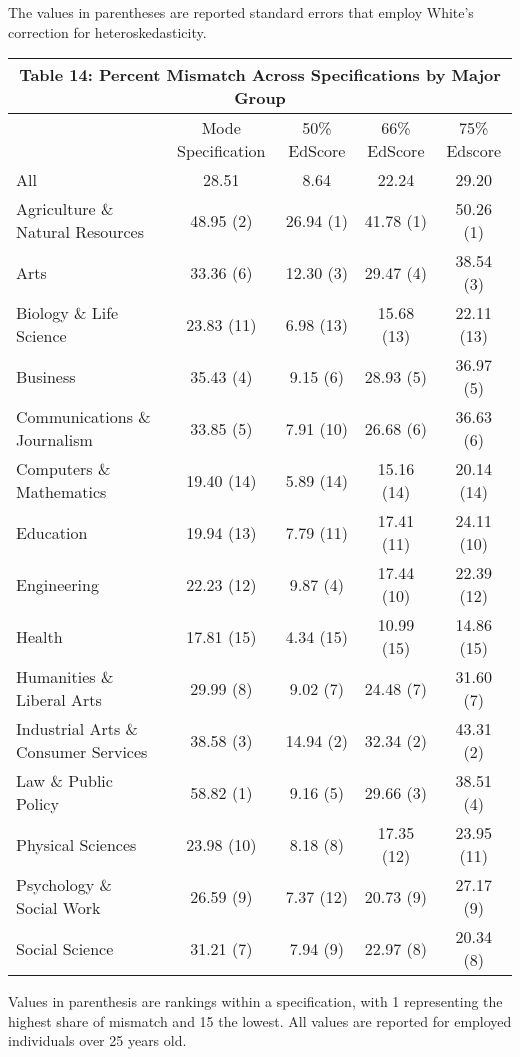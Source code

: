 \documentclass[11pt]{article}
\theoremstyle{definition}
\begin{document}
\hspace{12mm} \small{The values in parentheses are reported standard errors that employ White's correction for heteroskedasticity.} 

\small{
\vspace{2.5mm}
\noindent
\begin{center}
\begin{tabular}{l c c c c}
\hline\hline
\multicolumn{5}{c}{\textbf{Table 14: Percent Mismatch Across Specifications by Major Group}} \\
\hline
 & Mode Specification & 50\% EdScore & 66\% EdScore & 75\% Edscore    \\
\hline
All & 28.51 & 8.64 & 22.24 & 29.20 \\
Agriculture \& Natural Resources & 48.95 (2) &  26.94 (1) & 41.78 (1) & 50.26 (1) \\
Arts & 33.36 (6) & 12.30 (3) & 29.47 (4) & 38.54 (3) \\
Biology \& Life Science & 23.83 (11) & 6.98 (13) & 15.68 (13) & 22.11 (13) \\
Business & 35.43 (4) & 9.15 (6) & 28.93 (5) & 36.97 (5) \\
Communications \& Journalism & 33.85 (5) & 7.91 (10) & 26.68 (6) & 36.63 (6) \\
Computers \& Mathematics & 19.40 (14) & 5.89 (14) & 15.16 (14) & 20.14 (14) \\
Education & 19.94 (13) & 7.79 (11) & 17.41 (11) & 24.11 (10) \\
Engineering & 22.23 (12) & 9.87 (4) & 17.44 (10) & 22.39 (12) \\
Health & 17.81 (15) & 4.34 (15) & 10.99 (15) & 14.86 (15) \\
Humanities \& Liberal Arts & 29.99 (8) & 9.02 (7) & 24.48 (7) & 31.60 (7) \\
Industrial Arts \& Consumer Services & 38.58 (3) & 14.94 (2) & 32.34 (2) & 43.31 (2) \\
Law \& Public Policy & 58.82 (1) & 9.16 (5) & 29.66 (3) & 38.51 (4) \\
Physical Sciences & 23.98 (10) & 8.18 (8) & 17.35 (12) & 23.95 (11) \\
Psychology \& Social Work & 26.59 (9) & 7.37 (12) & 20.73 (9) & 27.17 (9) \\
Social Science & 31.21 (7) & 7.94 (9) & 22.97 (8) & 20.34 (8) \\
\hline\hline
\end{tabular} 
\end{center}} 
Values in parenthesis are rankings within a specification, with 1 representing the highest share of mismatch and 15 the lowest.  All values are reported for employed individuals over 25 years old.
\end{document}
